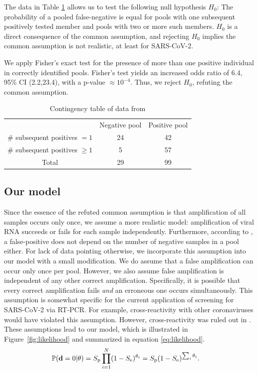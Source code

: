 \documentclass{article}
\begin{document}
The data in Table \ref{table} allows us to test the following null
hypothesis $H_0$: The probability of a pooled false-negative is equal
for pools with one subsequent positively tested member and pools with
two or more such members. $H_0$ is a direct consequence of the common
assumption, and rejecting $H_0$ implies the common assumption is not
realistic, at least for SARS-CoV-2.

We apply Fisher's exact test for the presence of more than one
positive individual in correctly identified pools. Fisher's test
yields an increased odds ratio of 6.4, 95\% CI (2.2,23.4), with a
p-value $\approx 10^{-4}$. Thus, we reject $H_0$, refuting the common
assumption.

\begin{table}[h]
\centering
\begin{tabular}{ c c c }
                                & Negative pool  & Positive pool \\%
\# subsequent positives $=1$    & 24             & 42            \\%
\# subsequent positives $\geq1$ & 5              & 57            \\%
 Total                          & 29             & 99            \\%
\end{tabular}
\caption{Contingency table of data from \cite{Salazar}}\label{table}
\end{table}


\subsection*{Our model}\label{subsec:ours}
Since the essence of the refuted common assumption is that
amplification of all samples occurs only once, we assume a more
realistic model: amplification of viral RNA succeeds or fails for each
sample independently. Furthermore, according to \cite{Simplistic1,
  Simplistic2, Kim, OptimalDorfmanPool}, a false-positive does not
depend on the number of negative samples in a pool either. For lack of
data pointing otherwise, we incorporate this assumption into our model
with a small modification. We do assume that a false amplification can
occur only once per pool. However, we also assume false amplification
is independent of any other correct amplification. Specifically, it is
possible that every correct amplification fails \emph{and} an
erroneous one occurs simultaneously. This assumption is somewhat
specific for the current application of screening for SARS-CoV-2 via
RT-PCR. For example, cross-reactivity with other coronaviruses would
have violated this assumption. However, cross-reactivity was ruled out
in \cite{KitComparison}. These assumptions lead to our model, which is
illustrated in Figure~\ref{fig:likelihood} and summarized in
equation \eqref{eq:likelihood}.
\begin{align}\label{eq:likelihood}
    \mathbb{P}(\mathbf{d}=0 | \theta) &= S_{\text{p}}\prod_{i=1}^N (1-S_{\text{e}})^{\theta_i} =
    S_{\text{p}}(1-S_\text{e})^{\sum_i\theta_i}.
\end{align}
\end{document}
